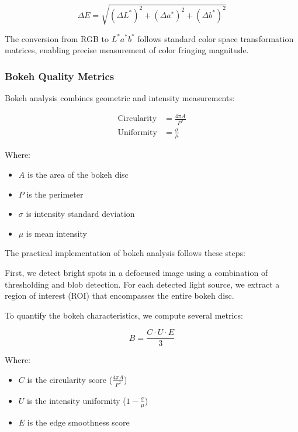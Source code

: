 \begin{equation}
\Delta E = \sqrt{(\Delta L^*)^2 + (\Delta a^*)^2 + (\Delta b^*)^2}
\end{equation}

The conversion from RGB to \( L^*a^*b^* \) follows standard color space transformation matrices, enabling precise measurement of color fringing magnitude.

\subsubsection{Bokeh Quality Metrics}
Bokeh analysis combines geometric and intensity measurements:

\begin{align}
\text{Circularity} &= \frac{4\pi A}{P^2} \\
\text{Uniformity} &= \frac{\sigma}{\mu}
\end{align}

Where:
\begin{itemize}
    \item \( A \) is the area of the bokeh disc
    \item \( P \) is the perimeter
    \item \( \sigma \) is intensity standard deviation
    \item \( \mu \) is mean intensity
\end{itemize}


The practical implementation of bokeh analysis follows these steps:

First, we detect bright spots in a defocused image using a combination of thresholding and blob detection. For each detected light source, we extract a region of interest (ROI) that encompasses the entire bokeh disc.

To quantify the bokeh characteristics, we compute several metrics:

\begin{equation}
B = \frac{C \cdot U \cdot E}{3}
\end{equation}

Where:
\begin{itemize}
    \item \( C \) is the circularity score (\( \frac{4\pi A}{P^2} \))
    \item \( U \) is the intensity uniformity (\( 1 - \frac{\sigma}{\mu} \))
    \item \( E \) is the edge smoothness score
\end{itemize}

